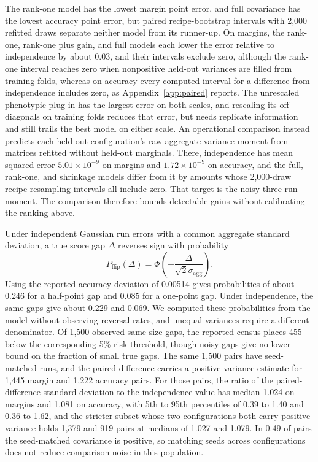 \documentclass{article}
\begin{document}
The rank-one model has the lowest margin point error, and full covariance has the lowest accuracy point error, but paired recipe-bootstrap intervals with 2,000 refitted draws separate neither model from its runner-up. On margins, the rank-one, rank-one plus gain, and full models each lower the error relative to independence by about 0.03, and their intervals exclude zero, although the rank-one interval reaches zero when nonpositive held-out variances are filled from training folds, whereas on accuracy every computed interval for a difference from independence includes zero, as Appendix~\ref{app:paired} reports. The unrescaled phenotypic plug-in has the largest error on both scales, and rescaling its off-diagonals on training folds reduces that error, but needs replicate information and still trails the best model on either scale. An operational comparison instead predicts each held-out configuration's raw aggregate variance moment from matrices refitted without held-out marginals. There, independence has mean squared error $5.01\times10^{-9}$ on margins and $1.72\times10^{-9}$ on accuracy, and the full, rank-one, and shrinkage models differ from it by amounts whose 2,000-draw recipe-resampling intervals all include zero. That target is the noisy three-run moment. The comparison therefore bounds detectable gains without calibrating the ranking above.

Under independent Gaussian run errors with a common aggregate standard deviation, a true score gap $\Delta$ reverses sign with probability
\begin{equation}
P_{\mathrm{flip}}(\Delta)=\Phi\left(-\frac{\Delta}{\sqrt{2}\sigma_{\mathrm{agg}}}\right).
\end{equation}
Using the reported accuracy deviation of 0.00514 gives probabilities of about 0.246 for a half-point gap and 0.085 for a one-point gap. Under independence, the same gaps give about 0.229 and 0.069. We computed these probabilities from the model without observing reversal rates, and unequal variances require a different denominator. Of 1,500 observed same-size gaps, the reported census places 455 below the corresponding 5\% risk threshold, though noisy gaps give no lower bound on the fraction of small true gaps. The same 1,500 pairs have seed-matched runs, and the paired difference carries a positive variance estimate for 1,445 margin and 1,222 accuracy pairs. For those pairs, the ratio of the paired-difference standard deviation to the independence value has median 1.024 on margins and 1.081 on accuracy, with 5th to 95th percentiles of 0.39 to 1.40 and 0.36 to 1.62, and the stricter subset whose two configurations both carry positive variance holds 1,379 and 919 pairs at medians of 1.027 and 1.079. In 0.49 of pairs the seed-matched covariance is positive, so matching seeds across configurations does not reduce comparison noise in this population.
\end{document}
